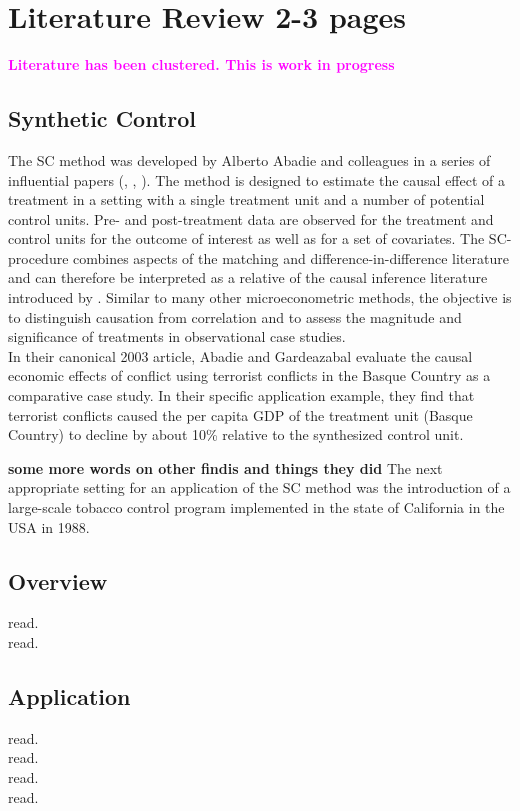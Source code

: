 \section{Literature Review 2-3 pages}

\textcolor{magenta}{\textbf{Literature has been clustered. This is work in progress}}

\subsection{Synthetic Control}
The \ac{SC} method was developed by Alberto Abadie and colleagues in a series of influential papers (\cite{abadie:2003}, \cite{abadie:2010}, \cite{abadie:2015}). The method is designed to estimate the causal effect of a treatment in a setting with a single treatment unit and a number of potential control units. Pre- and post-treatment data are observed for the treatment and control units for the outcome of interest as well as for a set of covariates. The \ac{SC}-procedure combines aspects of the matching and difference-in-difference literature and can therefore be interpreted as a relative of the causal inference literature introduced by \cite{rubin:1974}. Similar to many other microeconometric methods, the objective is to distinguish causation from correlation and to assess the magnitude and significance of treatments in observational case studies.
\\
In their canonical 2003 article, Abadie and Gardeazabal evaluate the causal economic effects of conflict using terrorist conflicts in the Basque Country as a comparative case study.  In their specific application example, they find that terrorist conflicts caused the per capita \ac{GDP} of the treatment unit (Basque Country) to decline by about 10\% relative to the synthesized control unit. 

\textbf{some more words on other findis and things they did}
The next appropriate setting for an application of the \ac{SC} method was the introduction of a large-scale tobacco control program implemented in the state of California in the \ac{USA} in 1988. 

 


\subsection{Overview}
\cite{abadie:2021a} read.\\
\cite{athey:2016} read.

\subsection{Application}
\cite{born:2019} read. \\
\cite{cho:2020} read.\\
\cite{cunningham:2021} read.\\
\cite{funke:2020} read.

